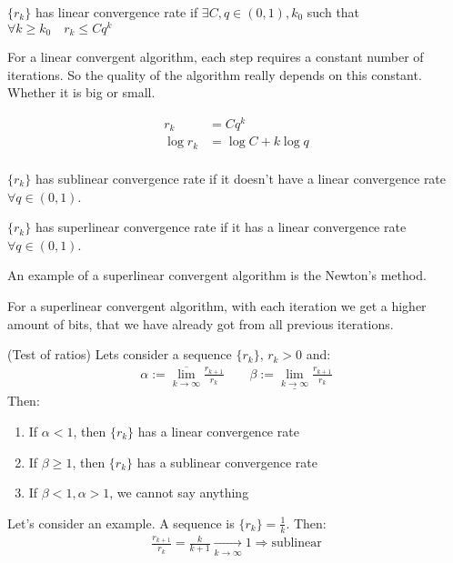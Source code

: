 \begin{definition}
  $\{r_k\}$ has linear convergence rate if $\exists C, q \in (0, 1), k_0$ such that $\forall k \geqslant k_0 \quad r_{k} \leqslant C q^k$
\end{definition}

For a linear convergent algorithm, each step requires a constant number of iterations.
So the quality of the algorithm really depends on this constant. Whether it is big or small.

\begin{align*}
  r_k &= C q^k \\ 
  \log r_k &= \log C + k \log q \\
\end{align*}

\begin{definition}
  $\{r_k\}$ has sublinear convergence rate if it doesn't have a linear convergence rate $\forall q \in (0, 1)$. 
\end{definition}

\begin{definition}
  $\{r_k\}$ has superlinear convergence rate if it has a linear convergence rate $\forall q \in (0, 1)$.
\end{definition}

\notice \; An example of a superlinear convergent algorithm is the Newton's method.

\notice \; For a superlinear convergent algorithm, with each iteration we get a higher amount of bits, that we have already got from all previous iterations. 

\begin{theorem} (Test of ratios) Lets consider a sequence $\{r_k\}$, $r_k > 0$ and: 
\begin{gather*}
  \alpha := \overline{\lim_{k \to \infty}} \frac{r_{k+1}}{r_k} \qquad \beta := \underline{\lim_{k \to \infty}} \frac{r_{k+1}}{r_k} 
\end{gather*}
Then: 
\begin{enumerate}
  \item If $\alpha < 1$, then $\{r_k\}$ has a linear convergence rate
  \item If $\beta \geqslant 1$, then $\{r_k\}$ has a sublinear convergence rate
  \item If $\beta < 1, \alpha > 1$, we cannot say anything
\end{enumerate}
\end{theorem}

Let's consider an example. A sequence is $\{r_k\} = \frac{1}{k}$. Then: 
\begin{gather*}
  \frac{r_{k+1}}{r_k} = \frac{k}{k+1} \xrightarrow[k \to \infty]{} 1 \Longrightarrow \text{sublinear} 
\end{gather*}

